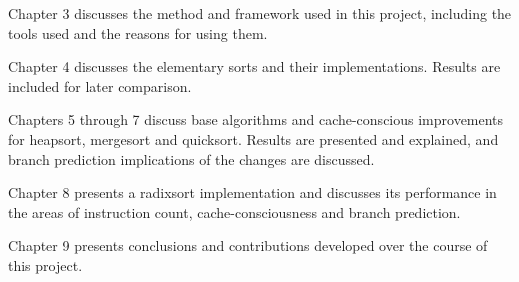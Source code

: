 Chapter 3 discusses the method and framework used in this project, including the
tools used and the reasons for using them.

Chapter 4 discusses the elementary sorts and their implementations. Results are
included for later comparison.

Chapters 5 through 7 discuss base algorithms and cache-conscious improvements
for heapsort, mergesort and quicksort. Results are presented and explained, and
branch prediction implications of the changes are discussed.

Chapter 8 presents a radixsort implementation and discusses its performance in
the areas of instruction count, cache-consciousness and branch prediction.

Chapter 9 presents conclusions and contributions developed over the course of
this project.
